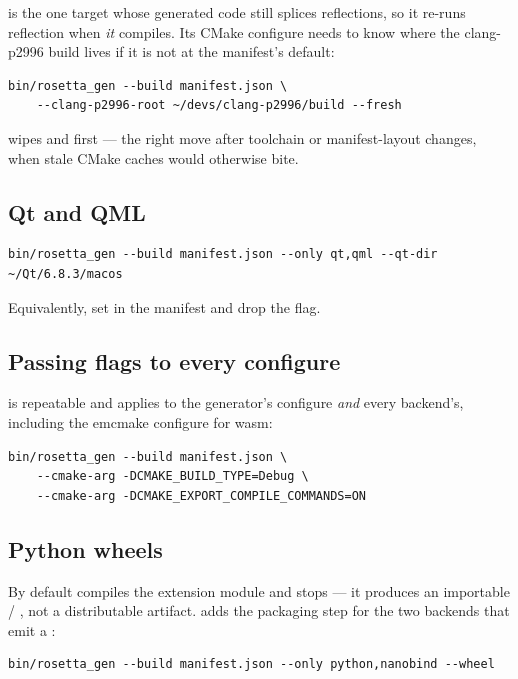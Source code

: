  is the one target whose generated code still splices reflections, so
it re-runs reflection when \emph{it} compiles. Its CMake configure needs to know
where the clang-p2996 build lives if it is not at the manifest's default:

\begin{lstlisting}[style=sh]
bin/rosetta_gen --build manifest.json \
    --clang-p2996-root ~/devs/clang-p2996/build --fresh
\end{lstlisting}

 wipes  and  first --- the right move
after toolchain or manifest-layout changes, when stale CMake caches would
otherwise bite.

\subsection{Qt and QML}

\begin{lstlisting}[style=sh]
bin/rosetta_gen --build manifest.json --only qt,qml --qt-dir ~/Qt/6.8.3/macos
\end{lstlisting}

Equivalently, set  in the manifest and drop the flag.

\subsection{Passing flags to every configure}

 is repeatable and applies to the generator's configure
\emph{and} every backend's, including the emcmake configure for wasm:

\begin{lstlisting}[style=sh]
bin/rosetta_gen --build manifest.json \
    --cmake-arg -DCMAKE_BUILD_TYPE=Debug \
    --cmake-arg -DCMAKE_EXPORT_COMPILE_COMMANDS=ON
\end{lstlisting}

\subsection{Python wheels}

By default  compiles the extension module and stops --- it
produces an importable  / , not a distributable artifact.
 adds the packaging step for the two backends that emit a
\code{make\_wheel.py}:

\begin{lstlisting}[style=sh]
bin/rosetta_gen --build manifest.json --only python,nanobind --wheel
\end{lstlisting}

